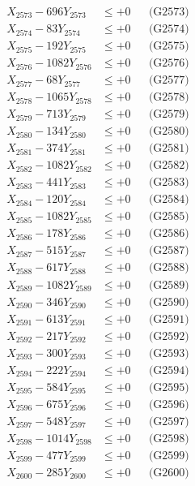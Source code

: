 \documentclass[a4paper,10pt]{article}
\begin{document}
{\begin{align}
X_{2573} - 696Y_{2573} &\leq +0 && \text{(G2573)} \\
X_{2574} - 83Y_{2574} &\leq +0 && \text{(G2574)} \\
X_{2575} - 192Y_{2575} &\leq +0 && \text{(G2575)} \\
X_{2576} - 1082Y_{2576} &\leq +0 && \text{(G2576)} \\
X_{2577} - 68Y_{2577} &\leq +0 && \text{(G2577)} \\
X_{2578} - 1065Y_{2578} &\leq +0 && \text{(G2578)} \\
X_{2579} - 713Y_{2579} &\leq +0 && \text{(G2579)} \\
X_{2580} - 134Y_{2580} &\leq +0 && \text{(G2580)} \\
\allowbreak
X_{2581} - 374Y_{2581} &\leq +0 && \text{(G2581)} \\
X_{2582} - 1082Y_{2582} &\leq +0 && \text{(G2582)} \\
X_{2583} - 441Y_{2583} &\leq +0 && \text{(G2583)} \\
X_{2584} - 120Y_{2584} &\leq +0 && \text{(G2584)} \\
X_{2585} - 1082Y_{2585} &\leq +0 && \text{(G2585)} \\
X_{2586} - 178Y_{2586} &\leq +0 && \text{(G2586)} \\
X_{2587} - 515Y_{2587} &\leq +0 && \text{(G2587)} \\
X_{2588} - 617Y_{2588} &\leq +0 && \text{(G2588)} \\
X_{2589} - 1082Y_{2589} &\leq +0 && \text{(G2589)} \\
X_{2590} - 346Y_{2590} &\leq +0 && \text{(G2590)} \\
\allowbreak
X_{2591} - 613Y_{2591} &\leq +0 && \text{(G2591)} \\
X_{2592} - 217Y_{2592} &\leq +0 && \text{(G2592)} \\
X_{2593} - 300Y_{2593} &\leq +0 && \text{(G2593)} \\
X_{2594} - 222Y_{2594} &\leq +0 && \text{(G2594)} \\
X_{2595} - 584Y_{2595} &\leq +0 && \text{(G2595)} \\
X_{2596} - 675Y_{2596} &\leq +0 && \text{(G2596)} \\
X_{2597} - 548Y_{2597} &\leq +0 && \text{(G2597)} \\
X_{2598} - 1014Y_{2598} &\leq +0 && \text{(G2598)} \\
X_{2599} - 477Y_{2599} &\leq +0 && \text{(G2599)} \\
X_{2600} - 285Y_{2600} &\leq +0 && \text{(G2600)} \\

\end{align}}
\end{document}
